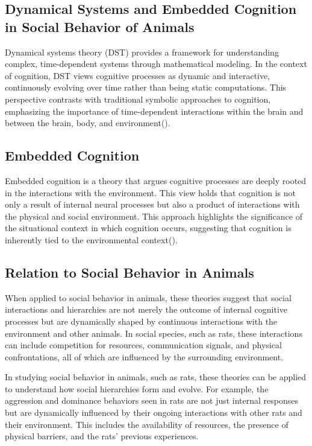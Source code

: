 \documentclass[english, a4paper, 11pt]{article}
\begin{document}
\subsection*{Dynamical Systems and Embedded Cognition in Social Behavior of Animals}

Dynamical systems theory (DST) provides a framework for understanding complex, time-dependent systems through mathematical modeling. In the context of cognition, DST views cognitive processes as dynamic and interactive, continuously evolving over time rather than being static computations. This perspective contrasts with traditional symbolic approaches to cognition, emphasizing the importance of time-dependent interactions within the brain and between the brain, body, and environment(\cite{beerDynamicalSystemsPerspective1995}).

\subsection*{Embedded Cognition}

Embedded cognition is a theory that argues cognitive processes are deeply rooted in the interactions with the environment. This view holds that cognition is not only a result of internal neural processes but also a product of interactions with the physical and social environment. This approach highlights the significance of the situational context in which cognition occurs, suggesting that cognition is inherently tied to the environmental context(\cite{beerDynamicalApproachesCognitive2000}).

\subsection*{Relation to Social Behavior in Animals}

When applied to social behavior in animals, these theories suggest that social interactions and hierarchies are not merely the outcome of internal cognitive processes but are dynamically shaped by continuous interactions with the environment and other animals. In social species, such as rats, these interactions can include competition for resources, communication signals, and physical confrontations, all of which are influenced by the surrounding environment.

In studying social behavior in animals, such as rats, these theories can be applied to understand how social hierarchies form and evolve. For example, the aggression and dominance behaviors seen in rats are not just internal responses but are dynamically influenced by their ongoing interactions with other rats and their environment. This includes the availability of resources, the presence of physical barriers, and the rats' previous experiences.
\end{document}
